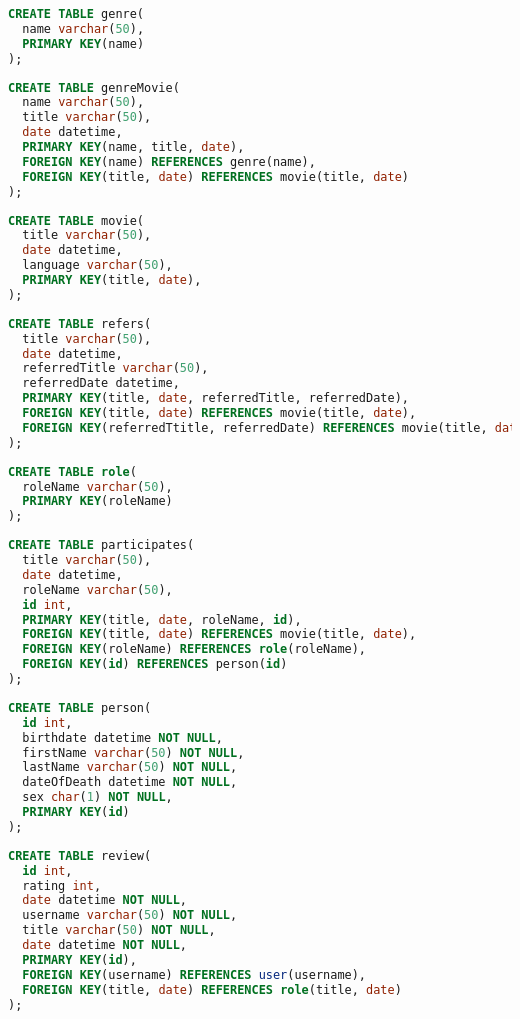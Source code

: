 \begin{lstlisting}[language=SQL]
CREATE TABLE genre(
  name varchar(50),
  PRIMARY KEY(name)
);
\end{lstlisting}

\begin{lstlisting}[language=SQL]
CREATE TABLE genreMovie(
  name varchar(50),
  title varchar(50),
  date datetime,
  PRIMARY KEY(name, title, date),
  FOREIGN KEY(name) REFERENCES genre(name),
  FOREIGN KEY(title, date) REFERENCES movie(title, date)
);
\end{lstlisting}

\begin{lstlisting}[language=SQL]
CREATE TABLE movie(
  title varchar(50),
  date datetime,
  language varchar(50),
  PRIMARY KEY(title, date),
);
\end{lstlisting}

\begin{lstlisting}[language=SQL]
CREATE TABLE refers(
  title varchar(50),
  date datetime,
  referredTitle varchar(50),
  referredDate datetime,
  PRIMARY KEY(title, date, referredTitle, referredDate),
  FOREIGN KEY(title, date) REFERENCES movie(title, date),
  FOREIGN KEY(referredTtitle, referredDate) REFERENCES movie(title, date)
);
\end{lstlisting}

\begin{lstlisting}[language=SQL]
CREATE TABLE role(
  roleName varchar(50),
  PRIMARY KEY(roleName)
);
\end{lstlisting}

\begin{lstlisting}[language=SQL]
CREATE TABLE participates(
  title varchar(50),
  date datetime,
  roleName varchar(50),
  id int,
  PRIMARY KEY(title, date, roleName, id),
  FOREIGN KEY(title, date) REFERENCES movie(title, date),
  FOREIGN KEY(roleName) REFERENCES role(roleName),
  FOREIGN KEY(id) REFERENCES person(id)
);
\end{lstlisting}

\begin{lstlisting}[language=SQL]
CREATE TABLE person(
  id int,
  birthdate datetime NOT NULL,
  firstName varchar(50) NOT NULL,
  lastName varchar(50) NOT NULL,
  dateOfDeath datetime NOT NULL,
  sex char(1) NOT NULL,
  PRIMARY KEY(id)
);
\end{lstlisting}

\begin{lstlisting}[language=SQL]
CREATE TABLE review(
  id int,
  rating int,
  date datetime NOT NULL,
  username varchar(50) NOT NULL,
  title varchar(50) NOT NULL,
  date datetime NOT NULL,
  PRIMARY KEY(id),
  FOREIGN KEY(username) REFERENCES user(username),
  FOREIGN KEY(title, date) REFERENCES role(title, date)
);
\end{lstlisting}
